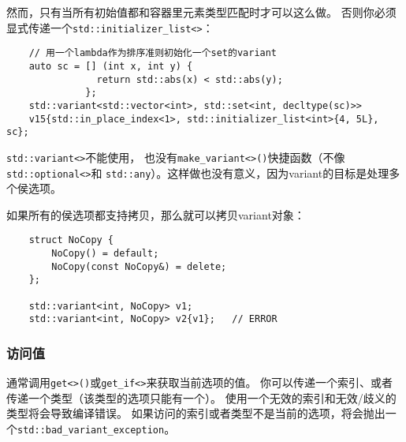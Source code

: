 然而，只有当所有初始值都和容器里元素类型匹配时才可以这么做。
否则你必须显式传递一个\texttt{std::initializer\_list<>}：
\begin{lstlisting}
    // 用一个lambda作为排序准则初始化一个set的variant
    auto sc = [] (int x, int y) {
                return std::abs(x) < std::abs(y);
              };
    std::variant<std::vector<int>, std::set<int, decltype(sc)>>
    v15{std::in_place_index<1>, std::initializer_list<int>{4, 5L}, sc};
\end{lstlisting}
\texttt{std::variant<>}不能使用，
也没有\texttt{make\_variant<>()}快捷函数（不像\texttt{std::optional<>}和
\texttt{std::any}）。这样做也没有意义，因为variant的目标是处理多个侯选项。

如果所有的侯选项都支持拷贝，那么就可以拷贝variant对象：
\begin{lstlisting}
    struct NoCopy {
        NoCopy() = default;
        NoCopy(const NoCopy&) = delete;
    };

    std::variant<int, NoCopy> v1;
    std::variant<int, NoCopy> v2{v1};   // ERROR
\end{lstlisting}

\subsubsection*{访问值}
通常调用\texttt{get<>()}或\texttt{get\_if<>}来获取当前选项的值。
你可以传递一个索引、或者传递一个类型（该类型的选项只能有一个）。
使用一个无效的索引和无效/歧义的类型将会导致编译错误。
如果访问的索引或者类型不是当前的选项，将会抛出一个\texttt{std::bad\_variant\_exception}。

